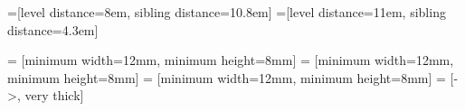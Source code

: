 \begin{frame}
\begin{adjustwidth}{-2.3em}{-2.5em}

=[level distance=8em, sibling distance=10.8em]
=[level distance=11em, sibling distance=4.3em]

 = [minimum width=12mm, minimum height=8mm]
 = [minimum width=12mm, minimum height=8mm]
 = [minimum width=12mm, minimum height=8mm]
 = [->, very thick]

\vspace{-2mm}

\vspace{5mm}


\end{adjustwidth}
\end{frame}
